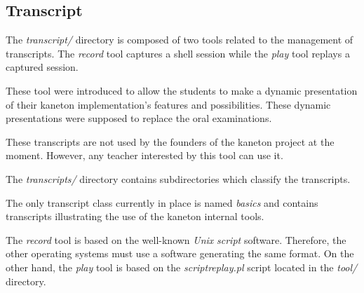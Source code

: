 %
%
%
%
%
%

%
%

\subsection{Transcript}

The \textit{transcript/} directory is composed of two tools related to
the management of transcripts. The \textit{record} tool captures a
shell session while the \textit{play} tool replays a captured session.

These tool were introduced to allow the students to make a dynamic presentation
of their kaneton implementation's features and possibilities. These dynamic
presentations were supposed to replace the oral examinations.

These transcripts are not used by the founders of the kaneton project at
the moment. However, any teacher interested by this tool can use it.

The \textit{transcripts/} directory contains subdirectories which classify
the transcripts.

The only transcript class currently in place is named \textit{basics} and
contains transcripts illustrating the use of the kaneton internal tools.

The \textit{record} tool is based on the well-known \textit{Unix}
\textit{script} software. Therefore, the other operating systems must use
a software generating the same format. On the other hand, the \textit{play}
tool is based on the \textit{scriptreplay.pl} script located in the
\textit{tool/} directory.

